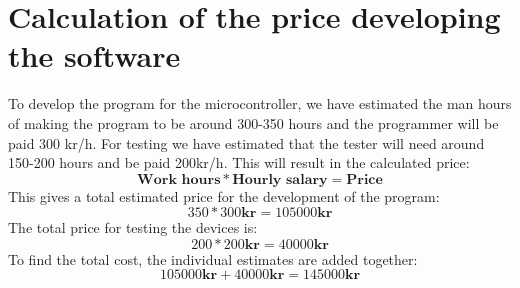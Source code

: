 \newpage
\section{Calculation of the price developing the software}
To develop the program for the microcontroller, we have estimated the man hours of making the program to be around 300-350 hours and the programmer will be paid 300 kr/h. For testing we have estimated that the tester will need around 150-200 hours and be paid 200kr/h.
\newline \newline
This will result in the calculated price:
$$\textbf{Work hours}*\textbf{Hourly salary}=\textbf{Price}$$
This gives a total estimated price for the development of the program:
$$350*300\textbf{kr}=105000\textbf{kr}$$
The total price for testing the devices is:
$$200*200\textbf{kr}=40000\textbf{kr}$$
To find the total cost, the individual estimates are added together:
$$105000\textbf{kr}+40000\textbf{kr}=145000\textbf{kr}$$
